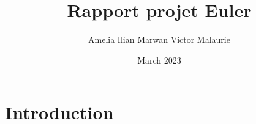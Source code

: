 \documentclass{article}
\title{Rapport projet Euler}
\author{Amelia Ilian Marwan Victor Malaurie}
\date{March 2023}
\begin{document}
\maketitle

\section{Introduction}
\end{document}

